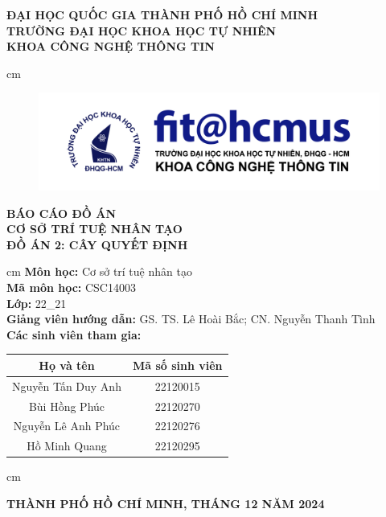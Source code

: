 \begin{titlepage}
	\begin{mybox}
		\begin{center}
			\fontsize{12}{12}\selectfont
			\textbf{ĐẠI HỌC QUỐC GIA THÀNH PHỐ HỒ CHÍ MINH}\\
			\textbf{TRƯỜNG ĐẠI HỌC KHOA HỌC TỰ NHIÊN}\\
			\textbf{KHOA CÔNG NGHỆ THÔNG TIN}
		\end{center}
		 cm
		\begin{figure}[H]
			\begin{center}
				\includegraphics[scale=0.5]{figures/fit-logo-chuan-V3}
			\end{center}
		\end{figure}
		\vskip 0.5cm
		\begin{center}
			\fontsize{16}{12}\selectfont
			\textbf{BÁO CÁO ĐỒ ÁN}\\
			\fontsize{24}{20}\selectfont
			\textbf{CƠ SỞ TRÍ TUỆ NHÂN TẠO}\\
			\fontsize{16}{12}\selectfont
			\textbf{ĐỒ ÁN 2: CÂY QUYẾT ĐỊNH}
		\end{center}
		 cm
		\fontsize{14}{12}\selectfont
		\textbf{Môn học:} Cơ sở trí tuệ nhân tạo\\
		\textbf{Mã môn học:} CSC14003\\
		\textbf{Lớp:} 22\_21\\
		\textbf{Giảng viên hướng dẫn:} GS. TS. Lê Hoài Bắc; CN. Nguyễn Thanh Tình\\
		\textbf{Các sinh viên tham gia:}
		\begin{center}
			\begin{tabular}{|c|c|}
				\hline
				\textbf{Họ và tên} & \textbf{Mã số sinh viên}\\
				\hline
				Nguyễn Tấn Duy Anh & 22120015\\
				\hline
				Bùi Hồng Phúc & 22120270\\
				\hline
				Nguyễn Lê Anh Phúc & 22120276\\
				\hline
				Hồ Minh Quang & 22120295\\
				\hline
			\end{tabular}
		\end{center}
		 cm
		\begin{center}
			\textbf{THÀNH PHỐ HỒ CHÍ MINH, THÁNG 12 NĂM 2024}
		\end{center}
	\end{mybox}
\end{titlepage}